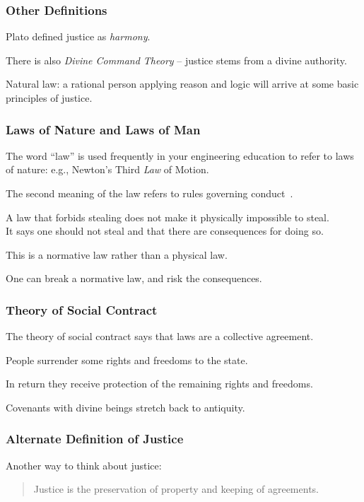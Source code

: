 \begin{frame}
\frametitle{Other Definitions}

Plato defined justice as \textit{harmony}.

There is also \textit{Divine Command Theory} -- justice stems from a divine authority.

Natural law: a rational person applying reason and logic will arrive at some basic principles of justice.


\end{frame}



\begin{frame}
\frametitle{Laws of Nature and Laws of Man}

The word ``law'' is used frequently in your engineering education to refer to laws of nature: e.g., Newton's Third \textit{Law} of Motion.

The second meaning of the law refers to rules governing conduct~\cite{lba}.

A law that forbids stealing does not make it physically impossible to steal.\\
\quad It says one should not steal and that there are consequences for doing so.

This is a \alert{normative} law rather than a \alert{physical} law.

One can break a normative law, and risk the consequences.

\end{frame}



\begin{frame}
\frametitle{Theory of Social Contract}

The theory of social contract says that laws are a collective agreement.

People surrender some rights and freedoms to the state.

In return they receive protection of the remaining rights and freedoms.

Covenants with divine beings stretch back to antiquity.

\end{frame}



\begin{frame}
\frametitle{Alternate Definition of Justice}

Another way to think about justice:

\begin{quote}
	Justice is the preservation of property and keeping of agreements.
\end{quote}

\end{frame}



